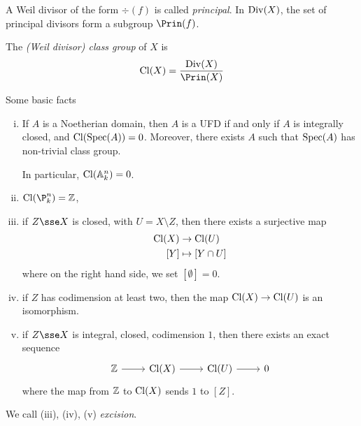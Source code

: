 \documentclass{article}
\begin{document}
\begin{definition}
    A Weil divisor of the form \(\div(f)\) is called \emph{principal}. In \(\operatorname{Div}(X)\), the set of principal divisors form a subgroup \(\Prin(f)\).
\end{definition}

\begin{definition}
    The \emph{(Weil divisor) class group} of \(X\) is
    \[\Cl(X) = \frac{\Div(X)}{\Prin(X)}\]
\end{definition}

\begin{proposition}
    Some basic facts
    \begin{enumerate}[(i)]
        \item If \(A\) is a Noetherian domain, then \(A\) is a UFD if and only if \(A\) is integrally closed, and \(\operatorname{Cl}(\operatorname{Spec}(A)) = 0\). Moreover, there exists \(A\) such that \(\operatorname{Spec}(A)\) has non-trivial class group.
        
        In particular, \(\operatorname{Cl}(\mathbb{A}_{k}^{n}) = 0\).
        \item \(\Cl(\P^n_k) = \Z\),
        \item if \(Z \sse X\) is closed, with \(U = X \setminus Z\), then there exists a surjective map
        \begin{align*}
            \operatorname{Cl}(X) &\to \operatorname{Cl}(U) \\
            [Y] &\mapsto [Y \cap U]
        \end{align*}
        where on the right hand side, we set \([\emptyset] = 0\).
        \item if \(Z\) has codimension at least two, then the map \(\operatorname{Cl}(X) \to \operatorname{Cl}(U)\) is an isomorphism.
        \item if \(Z \sse X\) is integral, closed, codimension \(1\), then there exists an exact sequence 
        \[\begin{tikzcd}
            \Z & {\Cl(X)} & {\Cl(U)} & 0
            \arrow[from=1-1, to=1-2]
            \arrow[from=1-2, to=1-3]
            \arrow[from=1-3, to=1-4]
        \end{tikzcd}\]
        where the map from \(\mathbb{Z}\) to \(\operatorname{Cl}(X)\) sends \(1\) to \([Z]\). 
    \end{enumerate}
    We call (iii), (iv), (v) \emph{excision}.
\end{proposition}
\end{document}
